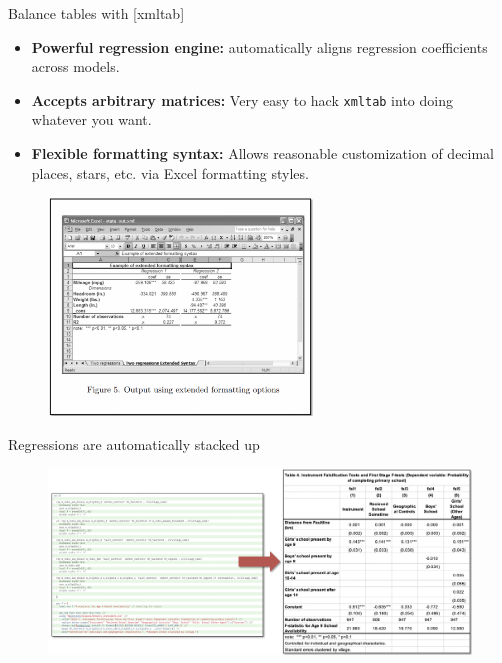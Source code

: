 \documentclass[aspectratio=169]{beamer}
\begin{document}
\begin{frame}{Balance tables with [xmltab]}
	\begin{multicols}{2}	
		
		\begin{itemize}[<default overlay specification>]
			\item<1> \textbf{Powerful regression engine:} automatically aligns regression coefficients across models.
			\item<1> \textbf{Accepts arbitrary matrices:} Very easy to hack \texttt{xmltab} into doing whatever you want. 
			\item<1> \textbf{Flexible formatting syntax:} Allows reasonable customization of decimal places, stars, etc. via Excel formatting styles.
		\end{itemize}
		
		\begin{figure}
			\centering
			\includegraphics[width=70mm]{img/Xml_tab}
		\end{figure}
		
	\end{multicols}
\end{frame}


\begin{frame}{Regressions are automatically stacked up}
	
	\begin{figure}
		\centering
		\includegraphics[width=\linewidth]{img/Regressions2}
	\end{figure}
	
\end{frame}
\end{document}
